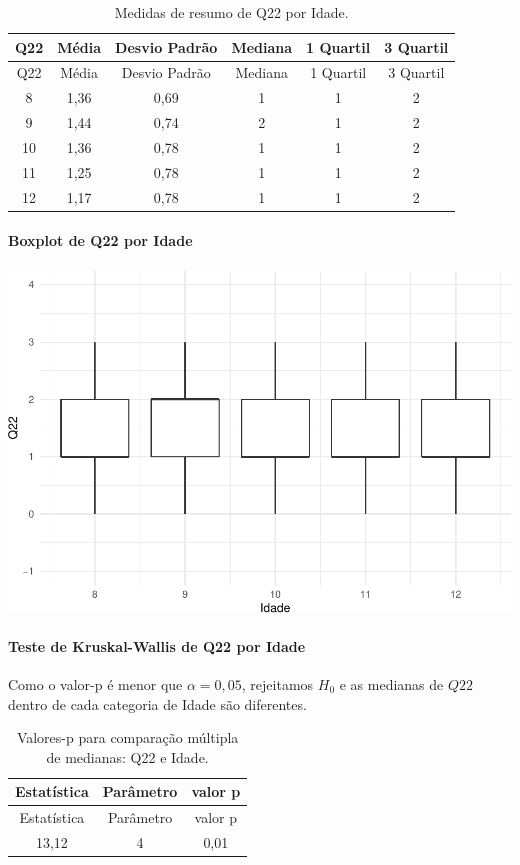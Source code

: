 \documentclass[]{article}
\let\oldparagraph\paragraph
\renewcommand{\paragraph}[1]{\oldparagraph{#1}\mbox{}}
\begin{document}
\begin{longtable}[]{@{}cccccc@{}}
\caption{\label{tab:unnamed-chunk-381}Medidas de resumo de Q22 por Idade.}\tabularnewline
\toprule
Q22 & Média & Desvio Padrão & Mediana & 1 Quartil & 3 Quartil\tabularnewline
\midrule
\endfirsthead
\toprule
Q22 & Média & Desvio Padrão & Mediana & 1 Quartil & 3 Quartil\tabularnewline
\midrule
\endhead
8 & 1,36 & 0,69 & 1 & 1 & 2\tabularnewline
9 & 1,44 & 0,74 & 2 & 1 & 2\tabularnewline
10 & 1,36 & 0,78 & 1 & 1 & 2\tabularnewline
11 & 1,25 & 0,78 & 1 & 1 & 2\tabularnewline
12 & 1,17 & 0,78 & 1 & 1 & 2\tabularnewline
\bottomrule
\end{longtable}

\hypertarget{boxplot-de-q22-por-idade}{%
\paragraph{Boxplot de Q22 por Idade}\label{boxplot-de-q22-por-idade}}

\begin{center}\includegraphics[width=0.75\linewidth]{relatorio_files/figure-latex/unnamed-chunk-382-1} \end{center}

\hypertarget{teste-de-kruskal-wallis-de-q22-por-idade}{%
\paragraph{Teste de Kruskal-Wallis de Q22 por Idade}\label{teste-de-kruskal-wallis-de-q22-por-idade}}

Como o valor-p é menor que \(\alpha=0,05\), rejeitamos \(H_0\) e as medianas de \(Q22\) dentro de cada categoria de Idade são diferentes.

\begin{longtable}[]{@{}ccc@{}}
\caption{\label{tab:unnamed-chunk-383}Valores-p para comparação múltipla de medianas: Q22 e Idade.}\tabularnewline
\toprule
Estatística & Parâmetro & valor p\tabularnewline
\midrule
\endfirsthead
\toprule
Estatística & Parâmetro & valor p\tabularnewline
\midrule
\endhead
13,12 & 4 & 0,01\tabularnewline
\bottomrule
\end{longtable}
\end{document}
